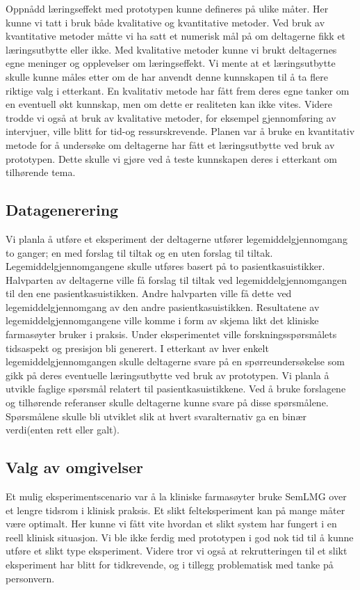 Oppnådd læringseffekt med prototypen kunne defineres på ulike måter. Her kunne vi tatt i bruk både kvalitative og kvantitative metoder. Ved bruk av kvantitative metoder måtte vi ha satt et numerisk mål på om deltagerne fikk et læringsutbytte eller ikke. Med kvalitative metoder kunne vi brukt deltagernes egne meninger og opplevelser om læringseffekt. Vi mente at et læringsutbytte skulle kunne måles etter om de har anvendt denne kunnskapen til å ta flere riktige valg i etterkant.  En kvalitativ metode har fått frem deres egne tanker om en eventuell økt kunnskap, men om dette er realiteten kan ikke vites. Videre trodde vi også at bruk av kvalitative metoder, for eksempel gjennomføring av intervjuer, ville blitt for tid-og ressurskrevende. Planen var å bruke en kvantitativ metode for å undersøke om deltagerne har fått et læringsutbytte ved bruk av prototypen. Dette skulle vi gjøre ved å teste kunnskapen deres i etterkant om tilhørende tema. 

\subsection{Datagenerering}
Vi planla å utføre et eksperiment der deltagerne utfører legemiddelgjennomgang to ganger; en med forslag til tiltak og en uten forslag til tiltak. Legemiddelgjennomgangene skulle utføres basert på to pasientkasuistikker. Halvparten av deltagerne ville få forslag til tiltak ved legemiddelgjennomgangen til den ene pasientkasuistikken. Andre halvparten ville få dette ved legemiddelgjennomgang av den andre pasientkasuistikken. Resultatene av legemiddelgjennomgangene ville komme i form av skjema likt det kliniske farmasøyter bruker i praksis. Under eksperimentet ville forskningsspørsmålets tidsaspekt og presisjon bli generert. I etterkant av hver enkelt legemiddelgjennomgangen skulle deltagerne svare på en spørreundersøkelse som gikk på deres eventuelle læringsutbytte ved bruk av prototypen. Vi planla å utvikle faglige spørsmål relatert til pasientkasuistikkene. Ved å bruke forslagene og tilhørende referanser skulle deltagerne kunne svare på disse spørsmålene. Spørsmålene skulle bli utviklet slik at hvert svaralternativ ga en binær verdi(enten rett eller galt).

\subsection{Valg av omgivelser}
Et mulig eksperimentscenario var å la kliniske farmasøyter bruke SemLMG over et lengre tidsrom i klinisk praksis. Et slikt felteksperiment kan på mange måter være optimalt. Her kunne vi fått vite hvordan et slikt system har fungert i en reell klinisk situasjon. Vi ble ikke ferdig med prototypen i god nok tid til å kunne utføre et slikt type eksperiment. Videre tror vi også at rekrutteringen til et slikt eksperiment har blitt for tidkrevende, og i tillegg problematisk med tanke på personvern. 

